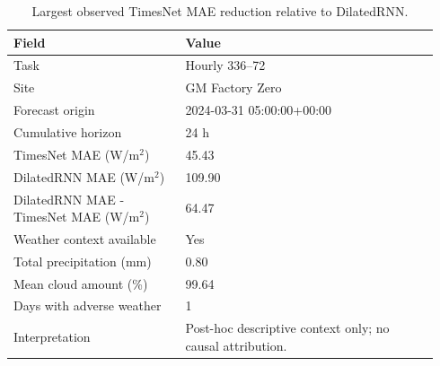 \begin{table}[htbp]
\centering
\footnotesize
\caption{Largest observed TimesNet MAE reduction relative to DilatedRNN.}
\label{tab:caso-maior-ganho-timesnet}
\begin{tabular}{@{}p{0.38\linewidth}p{0.56\linewidth}@{}}
\toprule
\textbf{Field} & \textbf{Value} \\
\midrule
Task & Hourly 336--72 \\
Site & GM Factory Zero \\
Forecast origin & 2024-03-31 05:00:00+00:00 \\
Cumulative horizon & 24 h \\
TimesNet MAE (W/m$^2$) & 45.43 \\
DilatedRNN MAE (W/m$^2$) & 109.90 \\
DilatedRNN MAE - TimesNet MAE (W/m$^2$) & 64.47 \\
Weather context available & Yes \\
Total precipitation (mm) & 0.80 \\
Mean cloud amount (\%) & 99.64 \\
Days with adverse weather & 1 \\
Interpretation & Post-hoc descriptive context only; no causal attribution. \\
\bottomrule
\end{tabular}
\end{table}
